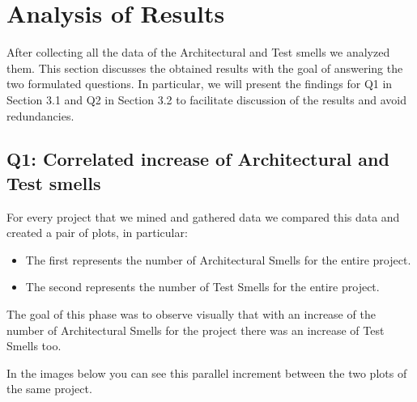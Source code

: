 \section{Analysis of Results}\label{sec:results}

After collecting all the data of the Architectural and Test smells we analyzed them. This section discusses the obtained results with the goal of answering the two formulated questions. In particular, we will present the findings for Q1 in Section 3.1 and Q2 in Section 3.2 to facilitate discussion of the results and avoid redundancies.

\subsection{Q1: Correlated increase of Architectural and Test smells}
For every project that we mined and gathered data we compared this data and created a pair of plots, in particular:
\begin{itemize}
  \item The first represents the number of Architectural Smells for the entire project.
  \item The second represents the number of Test Smells for the entire project.
\end{itemize}
The goal of this phase was to observe visually that with an increase of the number of Architectural Smells for the project there was an increase of Test Smells too.

In the images below you can see this parallel increment between the two plots of the same project.

